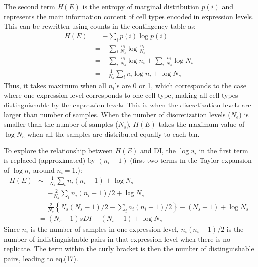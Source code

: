 The second term $H(E)$ is the entropy of marginal distribution $p(i)$ and represents the main information content of cell types encoded in expression levels. This can be rewritten using counts in the contingency table as:
\begin{align}
H(E) &= -\sum_{i}p(i)\log p(i) \\
     &= -\sum_{i}\frac{n_i}{N_s} \log \frac{n_i}{N_s} \\
     &= -\sum_{i}\frac{n_i}{N_s} \log n_i + \sum_{i}\frac{n_i}{N_s}\log N_s \\
     &= - \frac{1}{N_s}\sum_{i}n_i\log n_i + \log N_s
\end{align}
Thus, it takes maximum when all $n_i$'s are 0 or 1, which corresponds to the case where one expression level corresponds to one cell type, making all cell types distinguishable by the expression levels. This is when the discretization levels are larger than number of samples. When the number of discretization levels ($N_e$) is smaller than the number of samples ($N_s$), $H(E)$ takes the maximum value of $\log N_e$ when all the samples are distributed equally to each bin.

To explore the relationship between $H(E)$ and DI, the $\log n_i$ in the first term is replaced (approximated) by $(n_i-1)$ (first two terms in the Taylor expansion of $\log n_i$ around $n_i=1$.):
\begin{align}
H(E) &\sim -\frac{1}{N_s}\sum_{i}n_i (n_i-1) + \log N_s \\
	 &= -\frac{2}{N_s}\sum_{i}n_i (n_i-1)/2 + \log N_s \\
     &=  \frac{2}{N_s}\left\{N_s(N_s-1)/2 - \sum_{i}n_i (n_i-1)/2\right\} - (N_s-1) + \log N_s \\
     &= (N_s-1) sDI - (N_s-1) + \log N_s 
\end{align}
Since $n_i$ is the number of samples in one expression level, $n_i(n_i-1)/2$ is the number of indistinguishable pairs in that expression level when there is no replicate. The term within the curly bracket is then the number of distinguishable pairs, leading to eq.(17). 

